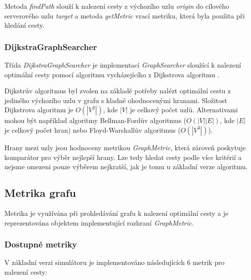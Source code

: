 \documentclass[czech,DP]{thesiskiv}
\begin{document}
\noindent Metoda \textit{findPath} slouží k nalezení cesty z výchozího uzlu \textit{origin} do cílového serverového uzlu \textit{target} a metoda \textit{getMetric} vrací metriku, která byla použita při hledání cesty.

\subsubsection*{DijkstraGraphSearcher}

Třída \textit{DijkstraGraphSearcher} je implementací \textit{GraphSearcher} sloužící k nalezení optimální cesty pomocí algoritmu vycházejícího z Dijkstrova algoritmu \cite[Sekce~24.3]{dijkstrabook}. 

Dijkstrův algoritmus byl zvolen na základě potřeby nalézt optimální cestu z jediného výchozího uzlu v grafu s kladně ohodnocenými hranami. Složitost Dijkstrova algoritmu je $O(|V^2|)$, kde $|V|$ je celkový počet uzlů. Alternativami mohou být například algoritmy Bellman-Fordův algoritmus ($O(|V||E|)$, kde $|E|$ je celkový počet hran) \cite{bellmanfordpaper} nebo Floyd-Warshallův algoritmus \cite{floydwarshall} ($O(|V^3|)$).

Hrany mezi uzly jsou hodnoceny metrikou \textit{GraphMetric}, která zároveň poskytuje komparátor pro výběr nejlepší hrany. Lze tedy hledat cesty podle více kritérií a nejsme omezeni pouze výběrem nejkratší, jak je tomu u základní verze algoritmu.

\subsection{Metrika grafu}

Metrika je využívána při prohledávání grafu k nalezení optimální cesty a je reprezentována objektem implementující rozhraní \textit{GraphMetric}.

\subsubsection*{Dostupné metriky}

V základní verzi simulátoru je implementováno následujících 6 metrik pro nalezení cesty:
\end{document}

